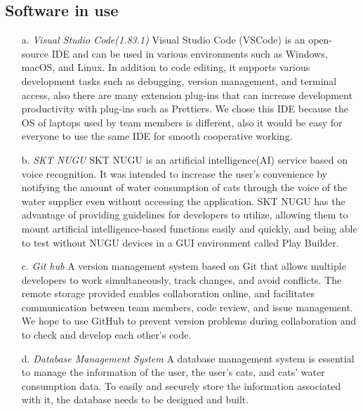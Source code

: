 \documentclass[conference]{IEEEtran}
\begin{document}
\subsection{Software in use}
\begin{itemize}
\item[a.]{\emph{Visual Studio Code(1.83.1)}}
   \newline
   Visual Studio Code (VSCode) is an open-source IDE and can be used in various environments such as Windows, macOS, and Linux. In addition to code editing, it supports various development tasks such as debugging, version management, and terminal access, also there are many extension plug-ins that can increase development productivity with plug-ins such as Prettiers. We chose this IDE because the OS of laptops used by team members is different, also it would be easy for everyone to use the same IDE for smooth cooperative working.
    \\ \end{itemize}
\begin{itemize}
\item[b.]{\emph{SKT NUGU}}
   \newline
   SKT NUGU is an artificial intelligence(AI) service based on voice recognition. It was intended to increase the user's convenience by notifying the amount of water consumption of cats through the voice of the water supplier even without accessing the application. SKT NUGU has the advantage of providing guidelines for developers to utilize, allowing them to mount artificial intelligence-based functions easily and quickly, and being able to test without NUGU devices in a GUI environment called Play Builder.
   \\ \end{itemize}
\begin{itemize}
\item[c.]{\emph{Git hub}}
   \newline
   A version management system based on Git that allows multiple developers to work simultaneously, track changes, and avoid conflicts. The remote storage provided enables collaboration online, and facilitates communication between team members, code review, and issue management. We hope to use GitHub to prevent version problems during collaboration and to check and develop each other's code.
    \\ \end{itemize}
\begin{itemize}
\item[d.]{\emph{Database Management System}}
   \newline
   A database management system is essential to manage the information of the user, the user's cats, and cats’ water consumption data. To easily and securely store the information associated with it, the database needs to be designed and built.
    \\ \end{itemize}
\end{document}
